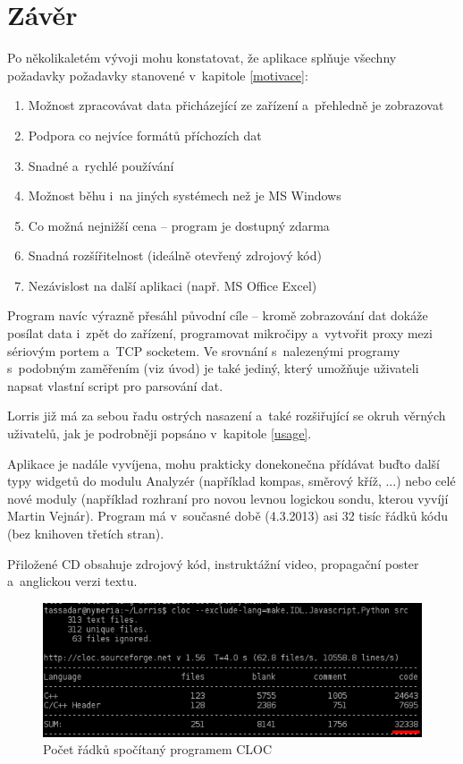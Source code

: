\documentclass[12pt, a4paper, oneside]{article}
\newcommand{\Has}{\textcolor{green}{\CheckmarkBold}}
\begin{document}
\section*{Závěr}
Po několikaletém vývoji mohu konstatovat, že aplikace splňuje všechny požadavky požadavky stanovené v~kapitole \ref{motivace}:
\begin{enumerate}[label=\Has\hspace{1.5mm}\arabic{*}.] 
    \item Možnost zpracovávat data přicházející ze zařízení a~přehledně je zobrazovat%
    \item Podpora co nejvíce formátů příchozích dat%
    \item Snadné a~rychlé používání %
    \item Možnost běhu i~na jiných systémech než je MS Windows %
    \item Co možná nejnižší cena -- program je dostupný zdarma%
    \item Snadná rozšířitelnost (ideálně otevřený zdrojový kód) %
    \item Nezávislost na další aplikaci (např. MS Office Excel) %
\end{enumerate}
Program navíc výrazně přesáhl původní cíle -- kromě zobrazování dat dokáže posílat data i~zpět do zařízení, programovat mikročipy a~vytvořit proxy mezi sériovým portem a~TCP socketem. Ve srovnání s~nalezenými programy s~podobným zaměřením (viz úvod) je také jediný, který umožňuje uživateli napsat vlastní script pro parsování dat.

Lorris již má za sebou řadu ostrých nasazení a~také rozšiřující se okruh věrných uživatelů, jak je podrobněji popsáno v~kapitole \ref{usage}.

Aplikace je nadále vyvíjena, mohu prakticky donekonečna přídávat buďto další typy widgetů do modulu Analyzér (například kompas, směrový kříž, ...) nebo celé nové moduly (například rozhraní pro novou levnou logickou sondu, kterou vyvíjí Martin Vejnár). Program má v~současné době (4.3.2013) asi 32 tisíc řádků kódu (bez knihoven třetích stran).

Přiložené CD obsahuje zdrojový kód, instruktážní video, propagační poster a~anglickou verzi textu.
\begin{figure}[H]
\begin{center}
\includegraphics[width=\textwidth]{img/cloc_edit.png}
\caption{Počet řádků spočítaný programem CLOC\cite{cloc}}
\end{center}
\end{figure}
\end{document}
